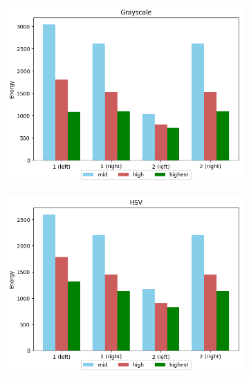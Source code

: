 \begin{figure}[H]
    \caption{Airplane STFT approach with Hann window for Grayscale (a) and HSV (b) colourspaces.}
    \centering
    \begin{subfigure}{.5\textwidth}
        \centering
        \includegraphics[scale=0.41]{images/appendix/stft/airplane/hann_Grayscale.png}
        \caption{}
    \end{subfigure}%
    \begin{subfigure}{.5\textwidth}
         \centering
          \includegraphics[scale=0.41]{images/appendix/stft/airplane/hann_HSV.png}
          \caption{}
    \end{subfigure}
    \fautor
\end{figure}


